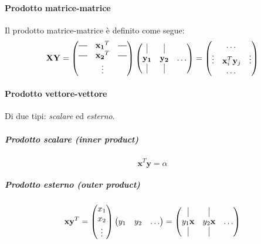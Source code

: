 \documentclass{article}
\newcommand*{\horzbar}{\rule[.5ex]{2.5ex}{0.5pt}}
\begin{document}
            \paragraph{Prodotto matrice-matrice}
                Il prodotto matrice-matrice è definito come segue:
                \[ \mathbf{XY} = 
                        \begin{pmatrix}
                                \horzbar     & \mathbf{x_1}^T        &  \horzbar \\
                                \horzbar    & \mathbf{x_2}^T        &   \horzbar\\
                                            & \vdots      & \\
                        \end{pmatrix}
                        \begin{pmatrix}
                            \vline          & \vline        & \\
                            \mathbf{y_1}    & \mathbf{y_2}  & \dots \\
                            \vline          & \vline       & \\
                        \end{pmatrix}
                    =
                        \begin{pmatrix}
                            & \dots & \\
                            \vdots & \mathbf{x}_i^T\mathbf{y}_j & \vdots \\
                            & \dots &
                        \end{pmatrix}
                    \]
            \paragraph{Prodotto vettore-vettore}
                Di due tipi: \emph{scalare} ed \emph{esterno}.
                \subparagraph{Prodotto scalare (inner product)}
                    \[\mathbf{x}^T\mathbf{y} = \alpha \]

                \subparagraph{Prodotto esterno (outer product)}
                    \[\mathbf{x}\mathbf{y}^T = 
                    \begin{pmatrix}
                        x_1 \\
                        x_2 \\
                        \vdots
                    \end{pmatrix}
                    \begin{pmatrix}
                        y_1 & y_2 & \dots
                    \end{pmatrix} =
                    \begin{pmatrix}
                        \vline          & \vline        & \\
                        y_1\mathbf{x}   & y_2\mathbf{x}  & \dots \\
                        \vline          & \vline       & \\
                    \end{pmatrix}
                    \]
\end{document}
